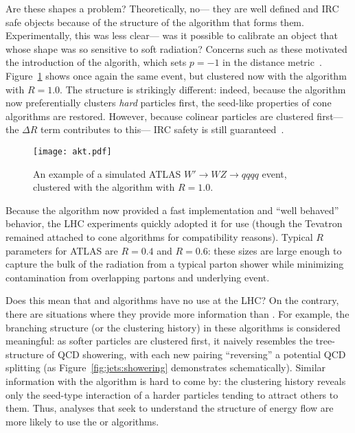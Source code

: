 



Are these shapes a problem? Theoretically, no--- they are well defined and IRC safe objects because of the structure of the algorithm that forms them. Experimentally, this was less clear--- was it possible to calibrate an object that whose shape was so sensitive to soft radiation? Concerns such as these motivated the introduction of the \antikt algorith, which sets $p=-1$ in the distance metric~\cite{Jetography}. Figure~\ref{fig:jets:akt} shows once again the same event, but clustered now with the \antikt algorithm with $R=1.0$. The structure is strikingly different: indeed, because the algorithm now preferentially clusters \textit{hard} particles first, the seed-like properties of cone algorithms are restored. However, because colinear particles are clustered first--- the $\Delta R$ term contributes to this--- IRC safety is still guaranteed~\cite{Jetography}.




\begin{figure}
\centering
\texttt{[image: akt.pdf]}
\label{fig:jets:akt}
\caption{An example of a simulated ATLAS $W'\rightarrow WZ\rightarrow qqqq$ event, clustered with the \antikt algorithm with $R=1.0$.}
\end{figure}


Because the \antikt algorithm now provided a fast implementation and ``well behaved'' behavior, the LHC experiments quickly adopted it for use (though the Tevatron remained attached to cone algorithms for compatibility reasons). Typical $R$ parameters for ATLAS are $R=0.4$ and $R=0.6$: these sizes are large enough to capture the bulk of the radiation from a typical parton shower while minimizing contamination from overlapping partons and underlying event.


Does this mean that \kt and \CA algorithms have no use at the LHC? On the contrary, there are situations where they provide more information than \antikt. For example, the branching structure (or the clustering history) in these algorithms is considered meaningful: as softer particles are clustered first, it naively resembles the tree-structure of QCD showering, with each new pairing ``reversing'' a potential QCD splitting (as Figure~\ref{fig:jets:showering} demonstrates schematically). Similar information with the \antikt algorithm is hard to come by: the clustering history reveals only the seed-type interaction of a harder particles tending to attract others to them. Thus, analyses that seek to understand the structure of energy flow are more likely to use the \kt or \CA algorithms.

